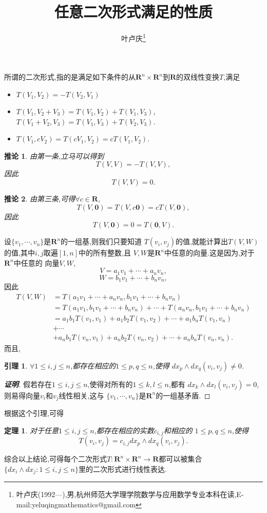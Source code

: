 \documentclass[a4paper]{article}
\newtheorem*{theo}{定理}
\newtheorem*{lem}{引理}
\newtheorem{coro}{推论}
\newenvironment{corollary}
{\bigskip\begin{mdframed}\begin{coro}}
    {\end{coro}\end{mdframed}\bigskip}
\newenvironment{theorem}
{\bigskip\begin{mdframed}\begin{theo}}
    {\end{theo}\end{mdframed}\bigskip}
\newenvironment{lemma}
{\bigskip\begin{mdframed}\begin{lem}}
    {\end{lem}\end{mdframed}\bigskip}
\begin{document}
\title{\huge{\bf{任意二次形式满足的性质}}} \author{\small{叶卢庆\footnote{叶卢庆(1992---),男,杭州师范大学理学院数学与应用数学专业本科在读,E-mail:yeluqingmathematics@gmail.com}}}
\maketitle
所谓的二次形式,指的是满足如下条件的从$\mathbf{R}^n\times\mathbf{R}^n$到$\mathbf{R}$的双线性变换$T$,满足
\begin{itemize}
\item $T(V_1,V_2)=-T(V_2,V_1)$
\item $T(V_1,V_2+V_3)=T(V_1,V_2)+T(V_1,V_3)$,$T(V_1+V_2,V_3)=T(V_1,V_3)+T(V_2,V_3)$.
\item $T(V_1,cV_2)=T(cV_1,V_2)=cT(V_1,V_2)$.
\end{itemize}
\begin{corollary}
由第一条,立马可以得到
$$
T(V,V)=-T(V,V),
$$
因此
$$
T(V,V)=0.
$$  
\end{corollary}
\begin{corollary}
由第三条,可得$\forall c\in \mathbf{R}$,
$$
T(V,\mathbf{0})=T(V,c\mathbf{0})=cT(V,\mathbf{0}),
$$
因此
$$
T(V,\mathbf{0})=0=T(\mathbf{0},V).
$$
\end{corollary}
设$\{v_1,\cdots,v_n\}$是$\mathbf{R}^n$的一组基,则我们只要知道
$T(v_i,v_j)$的值,就能计算出$T(V,W)$的值,其中$i,j$取遍$[1,n]$中的所有整数,且
$V,W$是$\mathbf{R}^n$中任意的向量.这是因为,对于$\mathbf{R}^n$中任意的
向量$V,W$,
$$
V=a_1v_1+\cdots+a_nv_n,
$$
$$
W=b_1v_1+\cdots+b_nv_n,
$$
因此
\begin{align*}
  T(V,W)&=T(a_1v_1+\cdots+a_nv_n,b_1v_1+\cdots+b_nv_n)
\\&=T(a_1v_1,b_1v_1+\cdots+b_nv_n)+\cdots+T(a_nv_n,b_1v_1+\cdots+b_nv_n)
\\&=a_1b_{1}T(v_1,v_1)+a_{1}b_{2}T(v_1,v_2)+\cdots+a_{1}b_{n}T(v_1,v_n)
\\&+\cdots
\\&+a_{n}b_{1}T(v_n,v_1)+a_{n}b_{2}T(v_n,v_2)+\cdots+a_{n}b_{n}T(v_n,v_n).
\end{align*}
而且,
\begin{lemma}
$\forall 1\leq i,j\leq n$,都存在相应的$1\leq p,q\leq n$,使得
$dx_p\wedge dx_q(v_i,v_j)\neq 0$.
\end{lemma}
\begin{proof}[\textbf{证明}]
假若存在$1\leq i,j\leq n$,使得对所有的$1\leq k,l\leq n$,都有
$dx_k\wedge dx_l(v_i,v_j)=0$,则易得向量$v_{i}$和$v_j$线性相关,这与
$\{v_1,\cdots,v_n\}$是$\mathbf{R}^n$的一组基矛盾.
\end{proof}
根据这个引理,可得
\begin{theorem}
对于任意$1\leq i,j\leq n$,都存在相应的实数$c_{i,j}$和相应的
$1\leq p,q\leq n$,使得
$$
T(v_i,v_j)=c_{i,j}dx_p\wedge dx_q(v_i,v_j).
$$
\end{theorem}
综合以上结论,可得每个二次形式$T:\mathbf{R}^n\times \mathbf{R}^n\to \mathbf{R}$都可以被集合$\{dx_i\wedge dx_j:1\leq i,j\leq n\}$里的二次形式进行线性表达.
\end{document}
